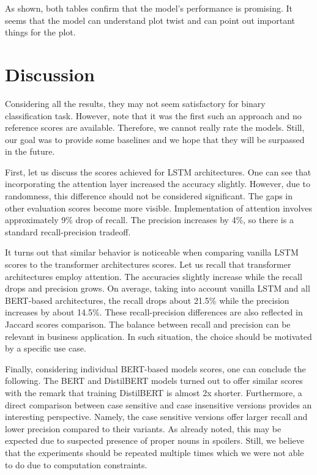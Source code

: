 \documentclass[11pt]{article}
\begin{document}
As shown, both tables confirm that the model's performance is promising. It seems that the model can understand plot twist and can point out important things for the plot.

\section{Discussion} \label{discussion}

Considering all the results, they may not seem satisfactory for binary classification task. However, note that it was the first such an approach and no reference scores are available. Therefore, we cannot really rate the models. Still, our goal was to provide some baselines and we hope that they will be surpassed in the future.

First, let us discuss the scores achieved for LSTM architectures. One can see that incorporating the attention layer increased the accuracy slightly. However, due to randomness, this difference should not be considered significant. The gaps in other evaluation scores become more visible. Implementation of attention involves approximately 9\% drop of recall. The precision increases by 4\%, so there is a standard recall-precision tradeoff.

It turns out that similar behavior is noticeable when comparing vanilla LSTM scores to the transformer architectures scores. Let us recall that transformer architectures employ attention. The accuracies slightly increase while the recall drops and precision grows. On average, taking into account vanilla LSTM and all BERT-based architectures, the recall drops about 21.5\% while the precision increases by about 14.5\%. These recall-precision differences are also reflected in Jaccard scores comparison. The balance between recall and precision can be relevant in business application. In such situation, the choice should be motivated by a specific use case.

Finally, considering individual BERT-based models scores, one can conclude the following. The BERT and DistilBERT models turned out to offer similar scores with the remark that training DistilBERT is almost 2x shorter. Furthermore, a direct comparison between case sensitive and case insensitive versions provides an interesting perspective. Namely, the case sensitive versions offer larger recall and lower precision compared to their variants. As already noted, this may be expected due to suspected presence of proper nouns in spoilers. Still, we believe that the experiments should be repeated multiple times which we were not able to do due to computation constraints.
\end{document}

